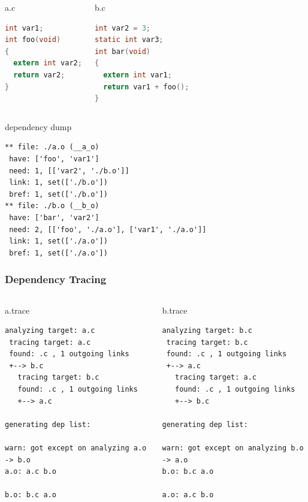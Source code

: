 \begin{frame}
	\begin{columns}
		\begin{block}{a.c}
		\begin{lstlisting}[language=c]
int var1;
int foo(void)
{
  extern int var2;
  return var2;
}
		\end{lstlisting}
		\end{block}

		\begin{block}{b.c}
		\begin{lstlisting}[language=c]
int var2 = 3;
static int var3;
int bar(void)
{
  extern int var1;
  return var1 + foo();
}
		\end{lstlisting}
		\end{block}
	\end{columns}

	\begin{block}{dependency dump}
		\begin{verbatim}
** file: ./a.o (__a_o)
 have: ['foo', 'var1']
 need: 1, [['var2', './b.o']]
 link: 1, set(['./b.o'])
 bref: 1, set(['./b.o'])
** file: ./b.o (__b_o)
 have: ['bar', 'var2']
 need: 2, [['foo', './a.o'], ['var1', './a.o']]
 link: 1, set(['./a.o'])
 bref: 1, set(['./a.o'])
		\end{verbatim}
	\end{block}
\end{frame}

\begin{frame}[fragile]
	\frametitle{Dependency Tracing}
	\begin{columns}
	\column{.48\textwidth}
		\begin{block}{a.trace}
			\begin{verbatim}
analyzing target: a.c
 tracing target: a.c
 found: .c , 1 outgoing links
 +--> b.c
   tracing target: b.c
   found: .c , 1 outgoing links
   +--> a.c

generating dep list:

warn: got except on analyzing a.o -> b.o
a.o: a.c b.o

b.o: b.c a.o
			\end{verbatim}
		\end{block}
	\column{.48\textwidth}
		\begin{block}{b.trace}
			\begin{verbatim}
analyzing target: b.c
 tracing target: b.c
 found: .c , 1 outgoing links
 +--> a.c
   tracing target: a.c
   found: .c , 1 outgoing links
   +--> b.c

generating dep list:

warn: got except on analyzing b.o -> a.o
b.o: b.c a.o

a.o: a.c b.o
			\end{verbatim}
		\end{block}
	\end{columns}
\end{frame}


